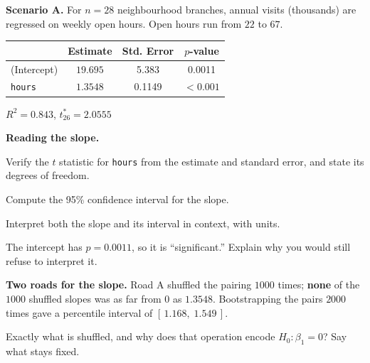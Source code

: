 \documentclass[11pt]{article}
\newcommand{\answerspace}[1]{\vspace{#1}}
\begin{document}
\noindent\textbf{Scenario A.} For $n = 28$ neighbourhood branches, annual visits (thousands) are
regressed on weekly open hours. Open hours run from $22$ to $67$.

\begin{center}
\renewcommand{\arraystretch}{1.2}
\begin{tabular}{lccc}
\toprule
 & \textbf{Estimate} & \textbf{Std. Error} & \textbf{$p$-value} \\
\midrule
(Intercept) & $19.695$ & 5.383 & 0.0011 \\
\texttt{hours} & $1.3548$ & 0.1149 & $<0.001$ \\
\bottomrule
\end{tabular}
\qquad $R^2 = 0.843$, \quad $t^{\ast}_{26} = 2.0555$
\end{center}

\begin{questions}

\item \textbf{Reading the slope.}

\begin{parts}
\item Verify the $t$ statistic for \texttt{hours} from the estimate and standard error, and state
its degrees of freedom.
\answerspace{3.5em}

\item Compute the 95\% confidence interval for the slope.
\answerspace{4em}

\item Interpret both the slope and its interval in context, with units.
\answerspace{4em}

\item The intercept has $p = 0.0011$, so it is ``significant.'' Explain why you would still refuse
to interpret it.
\answerspace{3.5em}
\end{parts}

\item \textbf{Two roads for the slope.} Road A shuffled the pairing $1000$ times; \textbf{none} of
the $1000$ shuffled slopes was as far from $0$ as $1.3548$. Bootstrapping the pairs $2000$ times
gave a percentile interval of $[\,1.168,\; 1.549\,]$.

\begin{parts}
\item Exactly what is shuffled, and why does that operation encode $H_0: \beta_1 = 0$? Say what
stays fixed.
\answerspace{4em}


\end{parts}
\end{questions}
\end{document}
